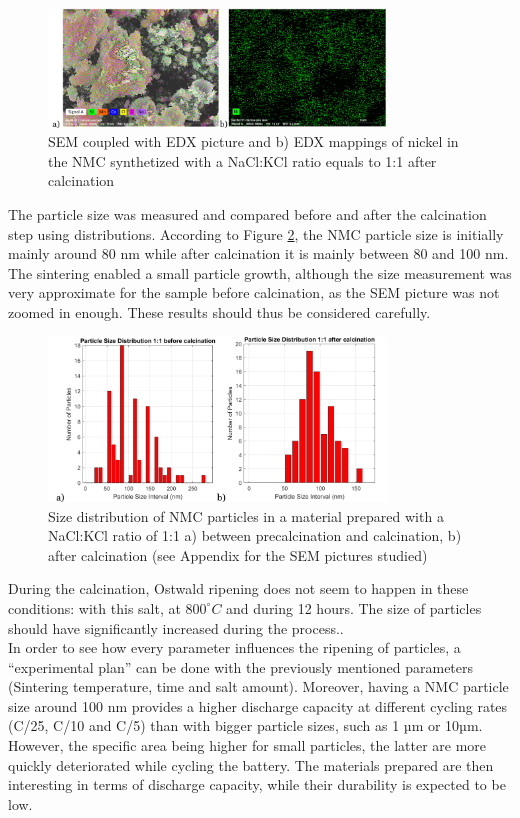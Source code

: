 \documentclass{article}
\begin{document}
\begin{figure}[H]
  \centering
  \includegraphics[width=0.8\textwidth]{calc.png}
  \caption{SEM coupled with EDX picture and b) EDX mappings of nickel in the NMC synthetized with a NaCl:KCl ratio equals to 1:1 after calcination}
  \label{calc}
\end{figure}
The particle size was measured and compared before and after the calcination step using distributions. 
According to Figure \ref{distrom}, the NMC particle size is initially mainly around 80 nm while after calcination 
it is mainly between 80 and 100 nm. The sintering enabled a small particle growth, although the size 
measurement was very approximate for the sample before calcination, as the SEM picture was not zoomed in enough. 
These results should thus be considered carefully.\\
\begin{figure}[H]
  \centering
  \includegraphics[width=0.8\textwidth]{distrom.png}
  \caption{Size distribution of NMC particles in a material prepared with a NaCl:KCl ratio of 1:1 a) between precalcination and calcination, b) after calcination (see Appendix for the SEM pictures studied) }
  \label{distrom}
\end{figure}
During the calcination, Ostwald ripening does not seem to happen in these conditions: with this salt,
 at \(800^\circ C\) and during 12 hours. The size of particles should have significantly increased during the
 process.\cite{B}\cite{shape}.\\ 
In order to see how every parameter influences the ripening of particles, a 
“experimental plan” can be done with the previously mentioned parameters (Sintering temperature, time and salt amount).  
Moreover, having a NMC particle size around 100 nm provides a higher discharge capacity at different cycling rates 
(C/25, C/10 and C/5) than with bigger particle sizes, such as 1 µm or 10µm. However, the specific area being higher
 for small particles, the latter are more quickly deteriorated while cycling the battery.\cite{Jian} 
The materials prepared are then interesting in terms of discharge capacity, while their durability is expected to be low. \\  
\end{document}
